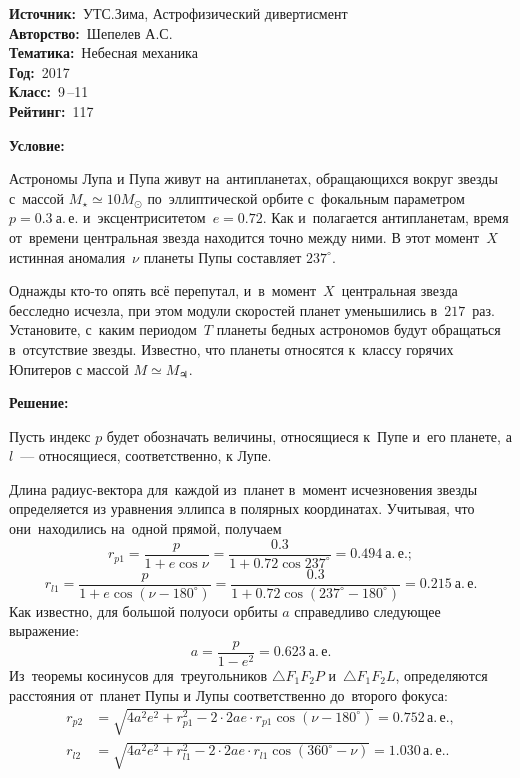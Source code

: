 \documentclass[12pt]{article}
\begin{document}
	\begin{footnotesize}
		\textbf{Источник:}~УТС.Зима, Астрофизический дивертисмент\\
		\textbf{Авторство:}~Шепелев А.С.\\
		\textbf{Тематика:}~Небесная механика\\
		\textbf{Год:}~2017\\
		\textbf{Класс:}~9\,--11\\
		\textbf{Рейтинг:}~117
	\end{footnotesize}
	
	\vspace{1pc}
	{\footnotesize \textbf{Условие:}}
	
	Астрономы Лупа и Пупа живут на~антипланетах, обращающихся вокруг звезды
    с~массой  $M_{\star} \simeq 10 M_\odot$ по~эллиптической орбите
    с~фокальным параметром~$p = 0.3~а.\,е.$
    и~эксцентриситетом~$e = 0.72$.
    Как и~полагается антипланетам, время от~времени центральная звезда
    находится точно между ними. В этот момент~$X$
    истинная аномалия~$\nu$ планеты Пупы составляет $237^\circ$.

    Однажды кто-то опять всё перепутал, и~в~момент~$X$~центральная звезда
    бесследно исчезла, при этом модули скоростей планет уменьшились
    в~$217$~раз. Установите, с~каким периодом~$T$ планеты
    бедных астрономов будут обращаться в~отсутствие звезды. 
    Известно, что планеты относятся к~классу горячих Юпитеров
    с массой $M \simeq M_{\jupiter}$.
	
	\vspace{1pc}
	{\footnotesize \textbf{Решение:}}
	
	Пусть индекс $p$ будет обозначать величины, относящиеся к~Пупе и~его планете, а $l$~--- относящиеся, соответственно, к Лупе.

    Длина радиус-вектора для~каждой из~планет
    в~момент исчезновения звезды определяется из уравнения эллипса в полярных координатах. Учитывая, что они~находились
    на~одной прямой, получаем
    \[
        r_{p1} = \frac{p}{1 + e \cos \nu} = \frac{0.3}{1 + 0.72 \cos 237^\circ} = 0.494~а.\,е.;
    \]
    \[
        r_{l1} = \frac{p}{1 + e \cos \left( \nu - 180^\circ \right)} = \frac{0.3}{1 + 0.72 \cos \left( 237^\circ - 180^\circ \right)}
            = 0.215~а.\,е.
    \]
    Как известно, для большой полуоси орбиты $a$ справедливо следующее выражение:
    \[
    	a = \dfrac{p}{1-e^2} = 0.623~а.\,е.
    \]
    Из~теоремы косинусов для~треугольников $\triangle F_1 F_2 P$
    и~$\triangle F_1 F_2 L$, определяются расстояния от~планет Пупы и Лупы соответственно до~второго фокуса:
    \begin{align}
    	r_{p2} &= \sqrt{4 a^2 e^2 + r_{p1}^2 -
    	       2 \cdot 2ae \cdot r_{p1}
    	       \cos \left( \nu - 180^\circ \right)} = 0.752 \, \text{а.}\,\text{е.},\\
    	r_{l2} &= \sqrt{4 a^2 e^2 + r_{l1}^2 -
    	       2 \cdot 2ae \cdot r_{l1}
    	       \cos \left( 360^\circ - \nu \right)} = 1.030 \, \text{а.}\,\text{е.}.
    \end{align}
\end{document}

